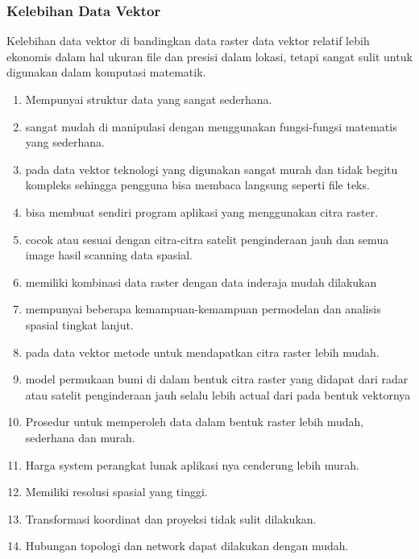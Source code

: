 \subsubsection{Kelebihan Data Vektor}
Kelebihan data vektor di bandingkan data raster
data vektor relatif lebih ekonomis dalam hal ukuran file dan presisi dalam lokasi, tetapi sangat sulit untuk digunakan dalam komputasi matematik. 
\begin{enumerate}
\item Mempunyai struktur data yang sangat sederhana.
\item sangat mudah di manipulasi dengan menggunakan fungsi-fungsi matematis yang sederhana.
\item pada data vektor teknologi yang digunakan sangat murah dan tidak begitu kompleks sehingga pengguna bisa membaca langsung seperti file teks.
\item bisa membuat sendiri program aplikasi yang menggunakan citra raster.
\item cocok atau sesuai dengan citra-citra satelit penginderaan jauh dan semua image hasil scanning data spasial.
\item  memiliki kombinasi data raster dengan data inderaja mudah dilakukan
\item mempunyai beberapa kemampuan-kemampuan permodelan dan analisis spasial tingkat lanjut.
\item pada data vektor metode untuk mendapatkan citra raster lebih mudah.
\item model permukaan bumi di dalam bentuk citra raster yang didapat dari radar atau satelit penginderaan jauh selalu lebih actual dari pada bentuk vektornya
\item Prosedur untuk memperoleh data dalam bentuk raster lebih mudah, sederhana dan murah.
\item Harga system perangkat lunak aplikasi nya cenderung lebih murah.
\item Memiliki resolusi spasial yang tinggi.
\item Transformasi koordinat dan proyeksi tidak sulit dilakukan.
\item Hubungan topologi dan network dapat dilakukan dengan mudah.
\end{enumerate}
